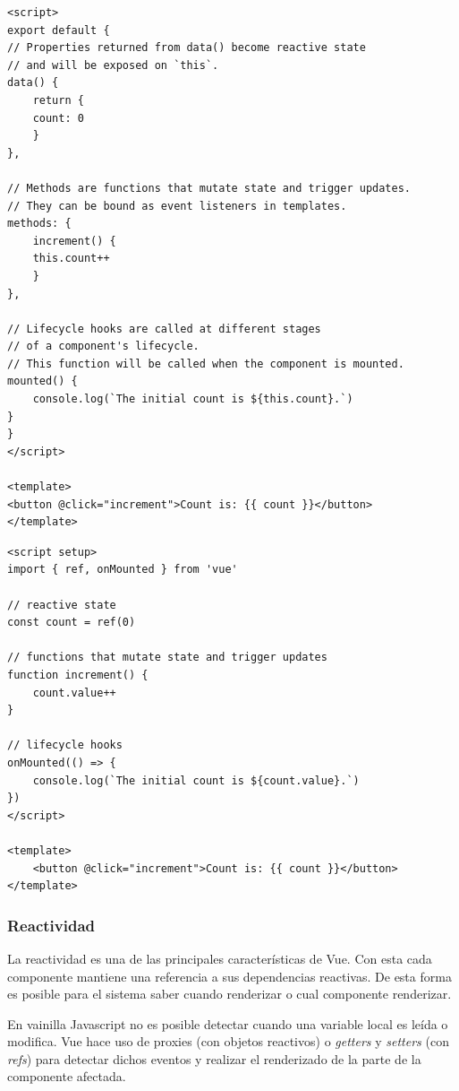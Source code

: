 \hspace{-0.65cm}\begin{minipage}{0.5\textwidth}
    \begin{lstlisting}[basicstyle=\ttfamily\tiny, numbers=none, caption=Options API.]
<script>
export default {
// Properties returned from data() become reactive state
// and will be exposed on `this`.
data() {
    return {
    count: 0
    }
},

// Methods are functions that mutate state and trigger updates.
// They can be bound as event listeners in templates.
methods: {
    increment() {
    this.count++
    }
},

// Lifecycle hooks are called at different stages
// of a component's lifecycle.
// This function will be called when the component is mounted.
mounted() {
    console.log(`The initial count is ${this.count}.`)
}
}
</script>

<template>
<button @click="increment">Count is: {{ count }}</button>
</template>
    \end{lstlisting}
\end{minipage}
\begin{minipage}{0.5\textwidth}
    \begin{lstlisting}[basicstyle=\ttfamily\tiny, numbers=none, caption=Composition API.]
<script setup>
import { ref, onMounted } from 'vue'

// reactive state
const count = ref(0)

// functions that mutate state and trigger updates
function increment() {
    count.value++
}

// lifecycle hooks
onMounted(() => {
    console.log(`The initial count is ${count.value}.`)
})
</script>

<template>
    <button @click="increment">Count is: {{ count }}</button>
</template>
    \end{lstlisting}
\end{minipage}

\subsubsection{Reactividad}

La reactividad es una de las principales características de Vue. Con esta cada componente mantiene una referencia a sus dependencias reactivas. De esta forma es posible para el sistema saber cuando renderizar o cual componente renderizar.

En vainilla Javascript no es posible detectar cuando una variable local es leída o modifica. Vue hace uso de proxies (con objetos reactivos) o \textit{getters} y \textit{setters} (con \textit{refs}) para detectar dichos eventos y realizar el renderizado de la parte de la componente afectada.

